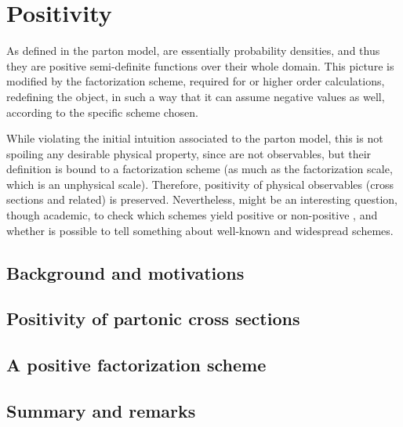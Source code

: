 
\chapter{Positivity}
\label{ch:pos}
\minitoc
\adjustmtc

As defined in the parton model, \pdf are essentially probability densities, and
thus they are positive semi-definite functions over their whole domain.
%
This picture is modified by the factorization scheme, required for \nlo or
higher order calculations, redefining the \pdf object, in such a way that it
can assume negative values as well, according to the specific scheme chosen.

While violating the initial intuition associated to the parton model, this is
not spoiling any desirable physical property, since \pdfs are not observables,
but their definition is bound to a factorization scheme (as much as the
factorization scale, which is an unphysical scale).
Therefore, positivity of physical observables (cross sections and related) is
preserved. 
%
Nevertheless, might be an interesting question, though academic, to check which
schemes yield positive or non-positive \pdf, and whether is possible to tell
something about well-known and widespread schemes.

\section{Background and motivations}
\label{sec:pos/motiv}


\section{Positivity of partonic cross sections}
\label{sec:pos/subtr}


\section{A positive factorization scheme}
\label{sec:pos/scheme}


\section{Summary and remarks}
\label{sec:pos/conc}

